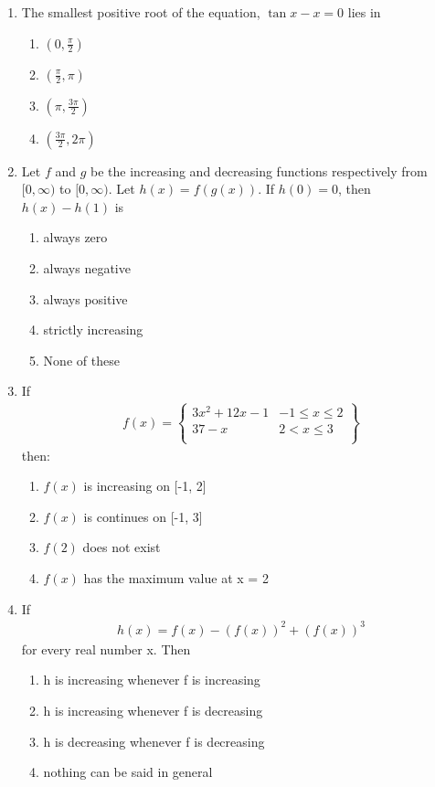 \begin{enumerate}[label=\arabic*.,ref=\thesubsection.\theenumi]
\item The smallest positive root of the equation, $\tan x - x = 0$ lies in
\begin{enumerate}
\item $(0, \frac{\pi}{2})$
\item $(\frac{\pi}{2}, \pi)$
\item $(\pi, \frac{3\pi}{2})$
\item $(\frac{3\pi}{2}, 2\pi)$
\end{enumerate}

\item Let $f$ and $g$ be the increasing and decreasing functions respectively from $[0, \infty)$ to $[0, \infty)$. Let $h(x) = f(g(x))$. If $h(0) = 0$, then $h(x) - h(1)$ is
\begin{enumerate}
\item always zero
\item always negative
\item always positive
\item strictly increasing
\item None of these
\end{enumerate}

\item If 
\begin{align*}
f(x)=
\left\lbrace
\begin{array}{ll} 
      3x^2 + 12x - 1 &  -1 \leq x \leq 2\\
      37 - x & 2 < x \leq 3\\
\end{array}
\right\rbrace
\end{align*}
then:
\begin{enumerate}
\item $f(x)$ is increasing on [-1, 2]
\item $f(x)$ is continues on [-1, 3]
\item $f(2)$ does not exist
\item $f(x)$ has the maximum value at x = 2
\end{enumerate}

\item If 
\begin{align*}
h(x) = f(x) - (f(x))^2 + (f(x))^3
\end{align*}
for every real number x. Then 
\begin{enumerate}
\item h is increasing whenever f is increasing
\item h is increasing whenever f is decreasing
\item h is decreasing whenever f is decreasing
\item nothing can be said in general
\end{enumerate}


\end{enumerate}

